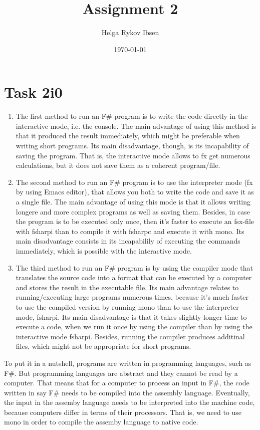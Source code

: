 \documentclass{article}
\begin{document}
\title{Assignment 2}
\author{Helga Rykov Ibsen}
\date{\today}
\maketitle

\section{Task 2i0}
\begin{enumerate}
  \item
The first method to run an F\# program is to write the code directly in the interactive mode, i.e. the console. The main advantage of using this method is that it produced the result immediately, which might be preferable when writing short programs. Its main disadvantage, though, is its incapability of saving the program. That is, the interactive mode allows to fx get numerous calculations, but it does not save them as a coherent program/file.

\item
The second method to run an F\# program is to use the interpreter mode (fx by using Emacs editor), that allows you both to write the code and save it as a single file. The main advantage of using this mode is that it allows writing longere and more complex programs as well as saving them. Besides, in case the program is to be executed only once, then it's faster to execute an fsx-file with fsharpi than to compile it with fsharpc and execute it with mono.  Its main disadvantage consists in its incapabilily of executing the commands immediately, which is possible with the interactive mode.

\item
The third method to run an F\# program is by using the compiler mode that translates the source code into a format that can be executed by a computer and stores the result in the executable file. Its main advantage relates to running/executing large programs numerous times, because it's much faster to use the compiled version by running mono than to use the interpreter mode, fsharpi. Its main disadvantage is that it takes slightly longer time to execute a code, when we run it once by using the compiler than by using the interactive mode fsharpi. Besides, running the compiler produces additinal files, which might not be appropriate for short programs.

\end{enumerate}
To put it in a nutshell, programs are written in programming languages, such as F\#. But programming languages are abstract and they cannot be read by a computer. That means that for a computer to process an input in F\#, the code written in say F\# needs to be compiled into the assembly language. Eventually, the input in the assemby language needs to be interpreted into the machine code, because computers differ in terms of their processors. That is, we need to use mono in order to compile the assemby language to native code.
\end{document}
